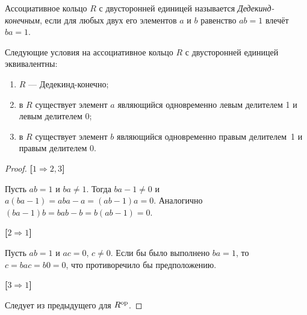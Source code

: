 
Ассоциативное кольцо $ R $ с двусторонней единицей называется \textit{Дедекинд-конечным}, если для любых двух его элементов $ a $ и $ b $ равенство $ ab = 1 $ влечёт $ ba = 1 $.

\begin{theorem}
	Следующие условия на ассоциативное кольцо $ R $ с двусторонней единицей эквивалентны:
	\begin{enumerate}
		\item $ R $ --- Дедекинд-конечно;
		\item в $ R $ существует элемент $ a $ являющийся одновременно левым делителем 1 и левым делителем 0;
		\item в $ R $ существует элемент $ b $ являющийся одновременно правым делителем~1 и правым делителем 0.
	\end{enumerate}
\end{theorem}

\begin{proof}
	\hfill
	
	\textbf{[$ 1 \Rightarrow 2, 3 $]}
	
	Пусть $ ab = 1 $ и $ ba \neq 1 $.
	Тогда $ ba - 1 \neq 0 $ и $ a(ba - 1) = aba - a = (ab - 1)a = 0 $.
	Аналогично $ (ba - 1)b = bab - b = b(ab - 1) = 0 $.
	
	\textbf{[$ 2 \Rightarrow 1 $]}
	
	Пусть $ ab = 1 $ и $ ac = 0 $, $ c \neq 0 $.
	Если бы было выполнено $ ba = 1 $, то $ c =  bac = b0 = 0 $, что противоречило бы предположению.
	
	\textbf{[$ 3 \Rightarrow 1 $]}
	
	Следует из предыдущего для $ R^{\mathrm{op}} $.
	
\end{proof}